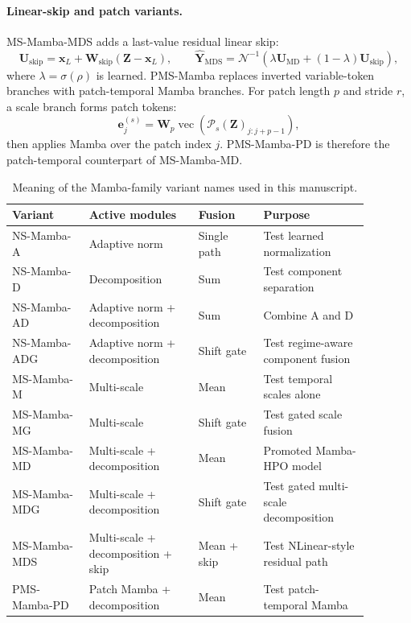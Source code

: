\paragraph{Linear-skip and patch variants.}
MS-Mamba-MDS adds a last-value residual linear skip:
\begin{equation}
    \mathbf{U}_{\mathrm{skip}}
    =
    \mathbf{x}_{L}
    +
    \mathbf{W}_{\mathrm{skip}}
    (\mathbf{Z}-\mathbf{x}_{L}),
    \qquad
    \hat{\mathbf{Y}}_{\mathrm{MDS}}
    =
    \mathcal{N}^{-1}
    \left(
    \lambda \mathbf{U}_{\mathrm{MD}}
    +
    (1-\lambda)\mathbf{U}_{\mathrm{skip}}
    \right),
\end{equation}
where $\lambda=\sigma(\rho)$ is learned.
PMS-Mamba replaces inverted variable-token branches with patch-temporal Mamba branches.
For patch length $p$ and stride $r$, a scale branch forms patch tokens:
\begin{equation}
    \mathbf{e}_{j}^{(s)}
    =
    \mathbf{W}_{p}
    \operatorname{vec}
    \left(
    \mathcal{P}_{s}(\mathbf{Z})_{j:j+p-1}
    \right),
\end{equation}
then applies Mamba over the patch index $j$.
PMS-Mamba-PD is therefore the patch-temporal counterpart of MS-Mamba-MD.

\begin{table}[t]
\centering
\caption{Meaning of the Mamba-family variant names used in this manuscript.}
\label{tab:mamba-variant-meaning}
{\small
\begin{tabular}{p{0.19\linewidth}p{0.27\linewidth}p{0.16\linewidth}p{0.26\linewidth}}
\toprule
Variant & Active modules & Fusion & Purpose \\
\midrule
NS-Mamba-A & Adaptive norm & Single path & Test learned normalization \\
NS-Mamba-D & Decomposition & Sum & Test component separation \\
NS-Mamba-AD & Adaptive norm + decomposition & Sum & Combine A and D \\
NS-Mamba-ADG & Adaptive norm + decomposition & Shift gate & Test regime-aware component fusion \\
MS-Mamba-M & Multi-scale & Mean & Test temporal scales alone \\
MS-Mamba-MG & Multi-scale & Shift gate & Test gated scale fusion \\
MS-Mamba-MD & Multi-scale + decomposition & Mean & Promoted Mamba-HPO model \\
MS-Mamba-MDG & Multi-scale + decomposition & Shift gate & Test gated multi-scale decomposition \\
MS-Mamba-MDS & Multi-scale + decomposition + skip & Mean + skip & Test NLinear-style residual path \\
PMS-Mamba-PD & Patch Mamba + decomposition & Mean & Test patch-temporal Mamba \\
\bottomrule
\end{tabular}
}
\end{table}

